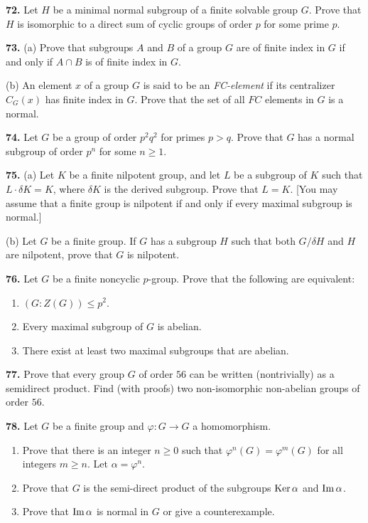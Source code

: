 \documentclass[a4paper,11pt,final]{memoir}%
\theoremstyle{nonumberplain}
\begin{document}
\medskip\noindent\textbf{72.} Let $H$ be a minimal normal subgroup of a finite
solvable group $G$. Prove that $H$ is isomorphic to a direct sum of cyclic
groups of order $p$ for some prime $p$.

\medskip\noindent\textbf{73.} (a) Prove that subgroups $A$ and $B$ of a group
$G$ are of finite index in $G$ if and only if $A\cap B$ is of finite index in
$G$.

\noindent(b) An element $x$ of a group $G$ is said to be an
\textit{FC-element\/} if its centralizer $C_{G}(x)$ has finite index in $G$.
Prove that the set of all $FC$ elements in $G$ is a normal.

\medskip\noindent\textbf{74.} Let $G$ be a group of order $p^{2}q^{2}$ for
primes $p>q$. Prove that $G$ has a normal subgroup of order $p^{n}$ for some
$n\geq1$.

\medskip\noindent\textbf{75.} (a) Let $K$ be a finite nilpotent group, and let
$L$ be a subgroup of $K$ such that $L\cdot\delta K=K$, where $\delta K$ is the
derived subgroup. Prove that $L=K$. [You may assume that a finite group is
nilpotent if and only if every maximal subgroup is normal.]

\noindent(b) Let $G$ be a finite group. If $G$ has a subgroup $H$ such that
both $G/\delta H$ and $H$ are nilpotent, prove that $G$ is nilpotent.

\medskip\noindent\textbf{76.} Let $G$ be a finite noncyclic $p$-group. Prove
that the following are equivalent:

\begin{enumerate}
\item $(G:Z(G))\leq p^{2}$.

\item Every maximal subgroup of $G$ is abelian.

\item There exist at least two maximal subgroups that are abelian.
\end{enumerate}

\medskip\noindent\textbf{77.} Prove that every group $G$ of order $56$ can be
written (nontrivially) as a semidirect product. Find (with proofs) two
non-isomorphic non-abelian groups of order $56$.

\medskip\noindent\textbf{78.} Let $G$ be a finite group and $\varphi
:G\rightarrow G$ a homomorphism.

\begin{enumerate}
\item Prove that there is an integer $n\geq0$ such that $\varphi
^{n}(G)=\varphi^{m}(G)$ for all integers $m\geq n$. Let $\alpha=\varphi^{n} $.

\item Prove that $G$ is the semi-direct product of the subgroups $\operatorname{Ker}\alpha$
and $\operatorname{Im}\alpha$.

\item Prove that $\operatorname{Im}\alpha$ is normal in $G$ or give a counterexample.
\end{enumerate}
\end{document}
